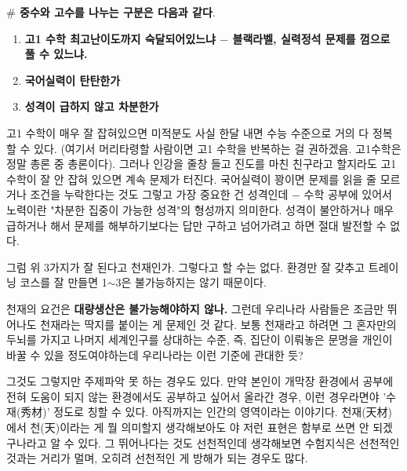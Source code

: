 \vspace{5mm}

\textbf{$\#$ 중수와 고수를 나누는 구분은 다음과 같다}.
\vspace{5mm}
\begin{enumerate}
    \item \textbf{고1 수학 최고난이도까지 숙달되어있느냐 $-$ 블랙라벨, 실력정석 문제를 껌으로 풀 수 있느냐.}
    \item \textbf{국어실력이 탄탄한가}
    \item \textbf{ 성격이 급하지 않고 차분한가}
\end{enumerate}
\vspace{5mm}

고1 수학이 매우 잘 잡혀있으면 미적분도 사실 한달 내면 수능 수준으로 거의 다 정복할 수 있다.
(여기서 머리타령할 사람이면 고1 수학을 반복하는 걸 권하겠음. 고1수학은 정말 총론 중 총론이다).
그러나 인강을 줄창 들고 진도를 마친 친구라고 할지라도 고1 수학이 잘 안 잡혀 있으면 계속 문제가 터진다.
국어실력이 꽝이면 문제를 읽을 줄 모르거나 조건을 누락한다는 것도 그렇고
가장 중요한 건 성격인데 $-$ 수학 공부에 있어서 노력이란 "차분한 집중이 가능한 성격"의 형성까지 의미한다.
성격이 불안하거나 매우 급하거나 해서 문제를 해부하기보다는 답만 구하고 넘어가려고 하면 절대 발전할 수 없다.
\vspace{5mm}

그럼 위 3가지가 잘 된다고 천재인가. 그렇다고 할 수는 없다.
환경만 잘 갖추고 트레이닝 코스를 잘 만들면 1$\sim$3은 불가능하지는 않기 때문이다.
\vspace{5mm}

천재의 요건은 \textbf{대량생산은 불가능해야하지 않나.}
그런데 우리나라 사람들은 조금만 뛰어나도 천재라는 딱지를 붙이는 게 문제인 것 같다.
보통 천재라고 하려면 그 혼자만의 두뇌를 가지고 나머지 세계인구를 상대하는 수준,
즉, 집단이 이뤄놓은 문명을 개인이 바꿀 수 있을 정도여야하는데 우리나라는 이런 기준에 관대한 듯?
\vspace{5mm}

그것도 그렇지만 주제파악 못 하는 경우도 있다.
만약 본인이 개막장 환경에서 공부에 전혀 도움이 되지 않는 환경에서도 공부하고 싶어서 올라간 경우,
이런 경우라면야 '수재(秀材)' 정도로 칭할 수 있다. 아직까지는 인간의 영역이라는 이야기다.
천재(天材)에서 천(天)이라는 게 뭘 의미할지 생각해보아도 야 저런 표현은 함부로 쓰면 안 되겠구나라고 알 수 있다.
그 뛰어나다는 것도 선천적인데 생각해보면 수험지식은 선천적인 것과는 거리가 멀며, 오히려 선천적인 게 방해가 되는 경우도 많다.
\vspace{5mm}

